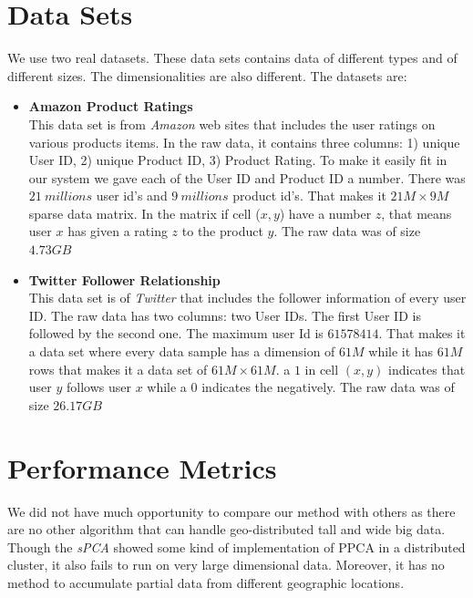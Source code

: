 \documentclass[12pt,notitlepage,oneside]{report}
\begin{document}
\section{Data Sets}
We use two real datasets. These data sets contains data of different types and of different sizes. The dimensionalities are also different. The datasets are:

\begin{itemize}
\item \textbf{Amazon Product Ratings}\hspace*{\fill} \\
This data set is from \textit{Amazon} web sites that includes the user ratings on various products items. In the raw data, it contains three columns: 1) unique User ID, 2) unique Product ID, 3) Product Rating. To make it easily fit in our system we gave each of the User ID and Product ID a number. There was $21\ millions$ user id's and $9\ millions$ product id's. That makes it $21M \times 9M$ sparse data matrix. In the matrix if cell ($x,y$) have a number $z$, that means user $x$ has given a rating $z$ to the product $y$. The raw data was of size $4.73GB$
\item \textbf{Twitter Follower Relationship}\hspace*{\fill} \\
This data set is of \textit{Twitter} that includes the follower information of every user ID. The raw data has two columns: two User IDs. The first User ID is followed by the second one. The maximum user Id is $61578414$. That makes it a data set where every data sample has a dimension of $61M$ while it has $61M$ rows that makes it a data set of $61M \times 61M$. a $1$ in cell $(x,y)$ indicates that user $y$ follows user $x$ while a $0$ indicates the negatively. The raw data was of size $26.17GB$
\end{itemize}

\section{Performance Metrics}
We did not have much opportunity to compare our method with others as there are no other algorithm that can handle geo-distributed tall and wide big data. Though the \textit{sPCA} \cite{elgamal} showed some kind of implementation of PPCA in a distributed cluster, it also fails to run on very large dimensional data. Moreover, it has no method to accumulate partial data from different geographic locations. 
\end{document}
